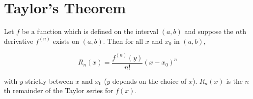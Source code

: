 \documentclass[12pt]{article}
\begin{document}
\section{Taylor's Theorem}

Let $f$ be a function which is defined on the interval $(a,b)$ and suppose the $n$th derivative $f^{(n)}$ exists on $(a,b)$.  Then for all $x$ and $x_0$ in $(a,b)$,

$$ R_n(x) = \frac{f^{(n)}(y)}{n!}(x-x_0)^n $$

with $y$ strictly between $x$ and $x_0$ ($y$ depends on the choice of $x$).  $R_n(x)$ is the $n$th remainder of the Taylor series for $f(x)$.
\end{document}
